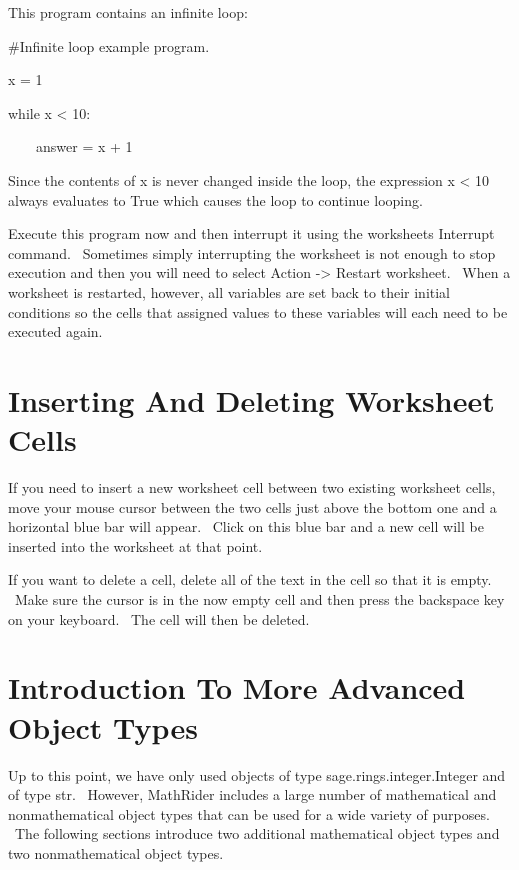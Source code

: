 \documentclass[12pt,twoside]{book}
\begin{document}
\bigskip

This program contains an infinite loop:


\bigskip

\#Infinite loop example program.


\bigskip

x = 1

while x {\textless} 10:

\ \ \ \ answer = x + 1

{\textbar}


\bigskip

Since the contents of x is never changed inside the loop, the expression x {\textless} 10 always evaluates to True which causes the loop to continue looping. 

\bigskip

Execute this program now and then interrupt it using the worksheet{\textquotesingle}s Interrupt command. \ Sometimes simply interrupting the worksheet is not enough to stop execution and then you will need to select Action {}-{\textgreater} Restart worksheet. \ When a worksheet is restarted, however, all variables are set back to their initial conditions so the cells that assigned values to these variables will each need to be executed again. 

\section[Inserting And Deleting Worksheet Cells]{Inserting And Deleting Worksheet Cells}

If you need to insert a new worksheet cell between two existing worksheet cells, move your mouse cursor between the two cells just above the bottom one and a horizontal blue bar will appear. \ Click on this blue bar and a new cell will be inserted into the worksheet at that point. 

\bigskip

If you want to delete a cell, delete all of the text in the cell so that it is empty. \ Make sure the cursor is in the now empty cell and then press the backspace key on your keyboard. \ The cell will then be deleted.

\section[Introduction To More Advanced Object Types]{Introduction To More Advanced Object Types}

Up to this point, we have only used objects of type {\textquotesingle}sage.rings.integer.Integer{\textquotesingle} and of type {\textquotesingle}str{\textquotesingle}. \ However, MathRider includes a large number of mathematical and nonmathematical object types that can be used for a wide variety of purposes. \ The following sections introduce two additional mathematical object types and two nonmathematical object types. 
\end{document}
